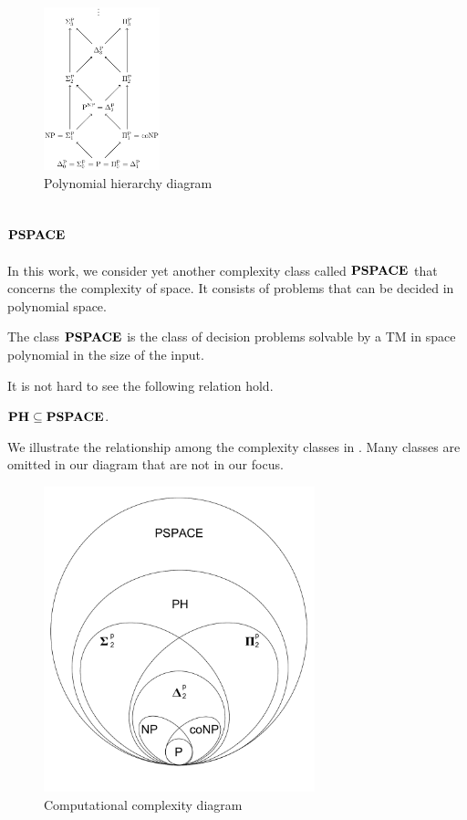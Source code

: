 \begin{figure}[h!]
  \centering
  \includegraphics[width=0.3\textwidth]{img/ph_diagram.png}
  \caption{Polynomial hierarchy diagram \label{fig:ph_diagram}}
\end{figure}

\subsection{$\textbf{PSPACE}$}
In this work, we consider yet another complexity class called $\textbf{PSPACE}$ that
concerns the complexity of space.
It consists of problems that can be decided in polynomial space.

\begin{definition}
	The class $\textbf{PSPACE}$ is the class of decision problems solvable by a TM
	in space polynomial in the size of the input.
\end{definition}
It is not hard to see the following relation hold.
\begin{center}
	$\textbf{PH} \subseteq \textbf{PSPACE}$.
\end{center}

We illustrate the relationship among the complexity classes in
. Many classes are omitted in our diagram
that are not in our focus.

\begin{figure}[h!]
  \centering
  \includegraphics[width=0.7\textwidth]{img/comp_diagram.pdf}
  \caption{Computational complexity diagram \label{fig:comp_diagram}}
\end{figure}


